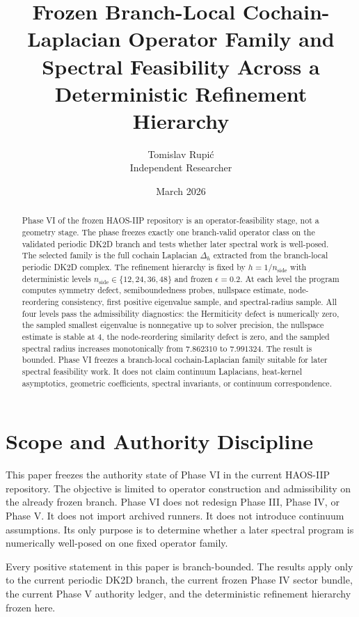 \documentclass[11pt]{article}
\title{Frozen Branch-Local Cochain-Laplacian Operator Family and Spectral Feasibility Across a Deterministic Refinement Hierarchy}
\author{Tomislav Rupi\'c \\ Independent Researcher}
\date{March 2026}
\begin{document}
\maketitle

\begin{abstract}
Phase VI of the frozen HAOS-IIP repository is an operator-feasibility stage, not a geometry stage. The phase freezes exactly one branch-valid operator class on the validated periodic DK2D branch and tests whether later spectral work is well-posed. The selected family is the full cochain Laplacian $\Delta_h$ extracted from the branch-local periodic DK2D complex. The refinement hierarchy is fixed by $h = 1 / n_{\mathrm{side}}$ with deterministic levels $n_{\mathrm{side}} \in \{12,24,36,48\}$ and frozen $\epsilon = 0.2$. At each level the program computes symmetry defect, semiboundedness probes, nullspace estimate, node-reordering consistency, first positive eigenvalue sample, and spectral-radius sample. All four levels pass the admissibility diagnostics: the Hermiticity defect is numerically zero, the sampled smallest eigenvalue is nonnegative up to solver precision, the nullspace estimate is stable at $4$, the node-reordering similarity defect is zero, and the sampled spectral radius increases monotonically from $7.862310$ to $7.991324$. The result is bounded. Phase VI freezes a branch-local cochain-Laplacian family suitable for later spectral feasibility work. It does not claim continuum Laplacians, heat-kernel asymptotics, geometric coefficients, spectral invariants, or continuum correspondence.
\end{abstract}

\section{Scope and Authority Discipline}

This paper freezes the authority state of Phase VI in the current HAOS-IIP repository. The objective is limited to operator construction and admissibility on the already frozen branch. Phase VI does not redesign Phase III, Phase IV, or Phase V. It does not import archived runners. It does not introduce continuum assumptions. Its only purpose is to determine whether a later spectral program is numerically well-posed on one fixed operator family.

Every positive statement in this paper is branch-bounded. The results apply only to the current periodic DK2D branch, the current frozen Phase IV sector bundle, the current Phase V authority ledger, and the deterministic refinement hierarchy frozen here.
\end{document}
